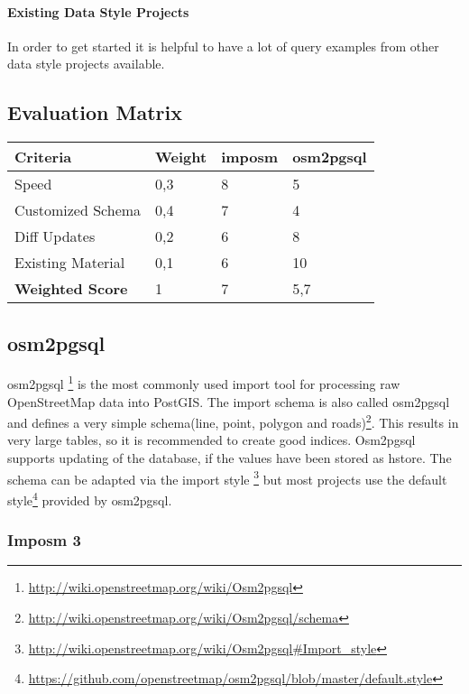 \paragraph{Existing Data Style Projects}
In order to get started it is helpful to have a lot of query examples
from other data style projects available.

\subsection{Evaluation Matrix}\label{evaluation_matrix}

\begin{center}
    \begin{tabular}{llll}
    \hline
    Criteria         & Weight & imposm & osm2pgsql \\
    \hline
    Speed             & 0,3    & 8      & 5         \\
    Customized Schema & 0,4    & 7      & 4         \\
    Diff Updates      & 0,2    & 6      & 8         \\
    Existing Material & 0,1    & 6      & 10        \\
    \hline
    \textbf{Weighted Score} & 1      & 7      & 5,7       \\
    \end{tabular}
\end{center}


\subsection{osm2pgsql}\label{osm2pgsql_importer}

osm2pgsql \footnote{\url{http://wiki.openstreetmap.org/wiki/Osm2pgsql}} is the
most commonly used import tool for processing raw OpenStreetMap data into PostGIS.
The import schema is also called osm2pgsql and defines a very
simple schema(line, point, polygon and
roads)\footnote{\url{http://wiki.openstreetmap.org/wiki/Osm2pgsql/schema}}.
This results in very large tables, so it is recommended to create good
indices. Osm2pgsql supports updating of the database, if the values have
been stored as hstore. The schema can be adapted via the import style \footnote{\url{http://wiki.openstreetmap.org/wiki/Osm2pgsql\#Import_style}}
but most projects use the default style\footnote{\url{https://github.com/openstreetmap/osm2pgsql/blob/master/default.style}} provided by osm2pgsql.

\subsubsection{Imposm 3 }\label{imposm-importer}

